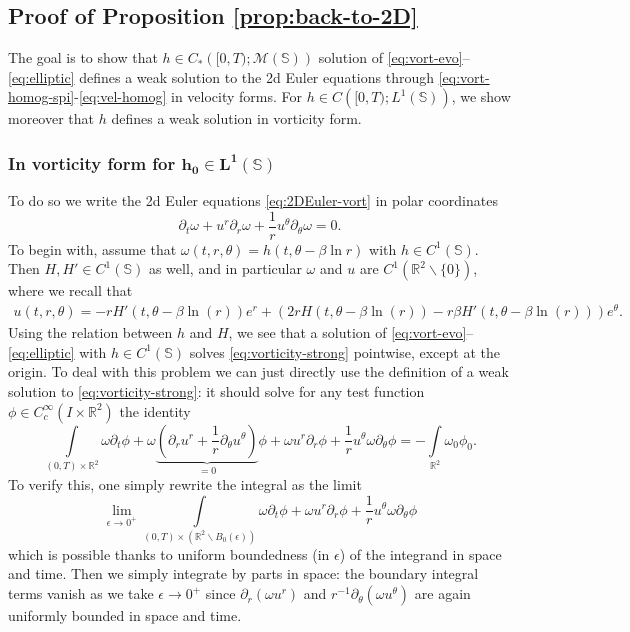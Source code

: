 \documentclass[10pt]{article}
\theoremstyle{definition}
\theoremstyle{remark}
\numberwithin{equation}{section}
\newcommand{\rd}{\partial}
\newcommand{\0}{\emptyset}
\newcommand{\eps}{\epsilon}
\newcommand{\tht}{\theta}
\newcommand{\omg}{\omega}
\newcommand{\bbR}{\mathbb R}
\newcommand{\bbS}{\mathbb S}
\begin{document}
	
	
	
	
	
	
	\subsection{Proof of Proposition \ref{prop:back-to-2D}}
	The goal is to show that $h\in C_*\left([0,T);\mathcal{M}\left(\mathbb{S}\right)\right)$ solution of \eqref{eq:vort-evo}--\eqref{eq:elliptic} defines a weak solution to the 2d Euler equations through \eqref{eq:vort-homog-spi}-\eqref{eq:vel-homog} in velocity forms. For $h\in C\left([0,T);L^1\left(\mathbb{S}\right)\right)$, we show moreover that $h$ defines a weak solution in vorticity form.
	\subsubsection{In vorticity form for $\boldsymbol{h_0\in L^1\left(\mathbb{S}\right)}$}
	To do so we write the 2d Euler equations \eqref{eq:2DEuler-vort} in polar coordinates 
	 \begin{equation}\label{eq:vorticity-strong}
	\partial_t \omega+u^r\partial_r \omega+\frac{1}{r}u^\theta \partial_\theta \omega=0.
	\end{equation} 
    To begin with, assume that $\omg(t,r,\theta)=h(t,\theta-\beta\ln r)$ with $h \in C^{1}(\bbS)$. Then $H, H' \in C^{1}(\bbS)$ as well, and in particular $\omg$ and $u$ are $C^{1}(\bbR^{2}\backslash\{0\})$, where we recall that \begin{equation}\label{eq:vel}
        \begin{split}
            u(t,r,\theta)=  -r H'(t,\theta -\beta \ln (r)) e^{r} + (
		2r H(t,\theta -\beta \ln (r))-r\beta H'(t,\theta -\beta \ln (r)) ) e^{\tht}.
        \end{split}
    \end{equation} Using the relation between $h$ and $H$, we see that a solution of \eqref{eq:vort-evo}--\eqref{eq:elliptic} with $h \in C^{1}(\bbS)$ solves \eqref{eq:vorticity-strong} pointwise, except at the origin. To deal with this problem we can just directly use the definition of a weak solution to \eqref{eq:vorticity-strong}: it should solve for any test function $\phi\in C^{\infty}_c\left(I\times \mathbb{R}^2\right)$ the identity 
	\[
	\int\limits_{(0,T)\times\mathbb{R}^2}\omega \partial_t\phi+\omega\underbrace{\left(\partial_r u^r+\frac{1}{r}\partial_\theta u^\theta\right)}_{=0}\phi+\omega u^r\partial_r \phi+\frac{1}{r}u^\theta\omega \partial_\theta \phi=-\int\limits_{\mathbb{R}^2}\omega_0\phi_0.
	\]
    To verify this, one simply rewrite the integral as the limit \[
	\lim_{\eps\to 0^+} \int\limits_{(0,T)\times(\mathbb{R}^2 \backslash B_{0}(\eps)) }\omega \partial_t\phi+\omega u^r\partial_r \phi+\frac{1}{r}u^\theta\omega \partial_\theta \phi\]
    which is possible thanks to uniform boundedness (in $\eps$) of the integrand in space and time. Then we simply integrate by parts in space: the boundary integral terms vanish as we take $\eps\to 0^+$ since $\rd_r(\omg u^r)$ and $r^{-1}\rd_\tht(\omg u^\tht)$ are again uniformly bounded in space and time. 
\end{document}
